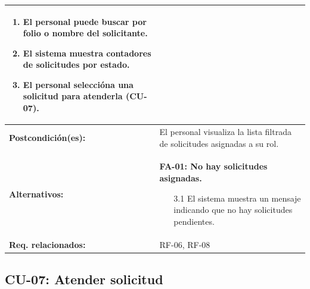 \begin{longtable}{|L{4cm}|L{9.5cm}|}
\begin{enumerate}[nosep, leftmargin=*]
        \item El personal puede buscar por folio o nombre del solicitante.
        \item El sistema muestra contadores de solicitudes por estado.
        \item El personal seleccióna una solicitud para atenderla (CU-07).
    \end{enumerate} \\
    \hline
    \textbf{Postcondición(es):} & El personal visualiza la lista filtrada de solicitudes asignadas a su rol. \\
    \hline
    \textbf{Alternativos:} &
    \textbf{FA-01: No hay solicitudes asignadas.}
    \begin{enumerate}[nosep, leftmargin=*]
        \item[3.1] El sistema muestra un mensaje indicando que no hay solicitudes pendientes.
    \end{enumerate} \\
    \hline
    \textbf{Req. relacionados:} & RF-06, RF-08 \\
    \hline
\end{longtable}

\subsection{CU-07: Atender solicitud}

